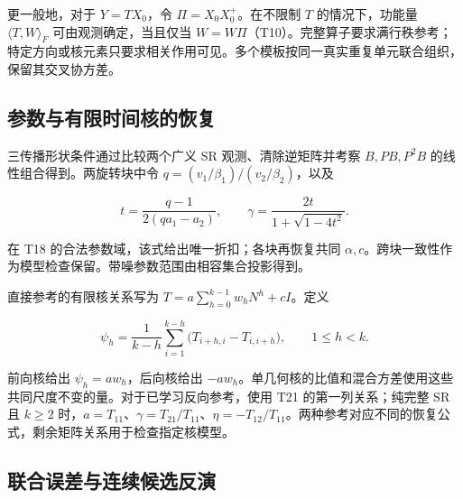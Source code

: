 \documentclass[11pt,a4paper]{article}
\begin{document}
更一般地，对于 \(Y=TX_0\)，令 \(\Pi=X_0X_0^+\)。在不限制 \(T\)
的情况下，功能量 \(\langle T,W\rangle_F\) 可由观测确定，当且仅当
\(W=W\Pi\)（T10）。完整算子要求满行秩参考；特定方向或核元素只要求相关作用可见。多个模板按同一真实重复单元联合组织，保留其交叉协方差。

\subsection{参数与有限时间核的恢复}\label{ux53c2ux6570ux4e0eux6709ux9650ux65f6ux95f4ux6838ux7684ux6062ux590d}

\par
\noindent\begin{minipage}{\linewidth}

三传播形状条件通过比较两个广义 SR 观测、清除逆矩阵并考察 \(B,PB,P^2B\)
的线性组合得到。两旋转块中令 \(q=(v_1/\beta_1)/(v_2/\beta_2)\)，以及

\[
t=\frac{q-1}{2(qa_1-a_2)},\qquad
\gamma=\frac{2t}{1+\sqrt{1-4t^2}}.
\]

\end{minipage}\par

在 T18 的合法参数域，该式给出唯一折扣；各块再恢复共同
\(\alpha,c\)。跨块一致性作为模型检查保留。带噪参数范围由相容集合投影得到。

\par
\noindent\begin{minipage}{\linewidth}

直接参考的有限核关系写为 \(T=a\sum_{h=0}^{k-1}w_hN^h+cI\)。定义

\[
\psi_h=\frac{1}{k-h}\sum_{i=1}^{k-h}
\bigl(T_{i+h,i}-T_{i,i+h}\bigr),\qquad 1\leq h<k.
\]

\end{minipage}\par

前向核给出 \(\psi_h=aw_h\)，后向核给出
\(-aw_h\)。单几何核的比值和混合方差使用这些共同尺度不变的量。对于已学习反向参考，使用
T21 的第一列关系；纯完整 SR 且 \(k\geq2\)
时，\(a=T_{11}\)、\(\gamma=T_{21}/T_{11}\)、\(\eta=-T_{12}/T_{11}\)。两种参考对应不同的恢复公式，剩余矩阵关系用于检查指定核模型。

\subsection{联合误差与连续候选反演}\label{ux8054ux5408ux8befux5deeux4e0eux8fdeux7eedux5019ux9009ux53cdux6f14}
\end{document}
